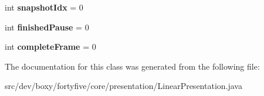 \begin{DoxyCompactItemize}
\item 
\hypertarget{classdev_1_1boxy_1_1fortyfive_1_1core_1_1presentation_1_1_linear_presentation_a1da66d84774b87c1dd6d9b6250d5b164}{
int {\bfseries snapshotIdx} = 0}
\label{db/dad/classdev_1_1boxy_1_1fortyfive_1_1core_1_1presentation_1_1_linear_presentation_a1da66d84774b87c1dd6d9b6250d5b164}

\item 
\hypertarget{classdev_1_1boxy_1_1fortyfive_1_1core_1_1presentation_1_1_linear_presentation_af3be3d966de2ecedda3db8c86c3a548d}{
int {\bfseries finishedPause} = 0}
\label{db/dad/classdev_1_1boxy_1_1fortyfive_1_1core_1_1presentation_1_1_linear_presentation_af3be3d966de2ecedda3db8c86c3a548d}

\item 
\hypertarget{classdev_1_1boxy_1_1fortyfive_1_1core_1_1presentation_1_1_linear_presentation_a40a3d6791c7eb8a7fdcf69e92d1410b0}{
int {\bfseries completeFrame} = 0}
\label{db/dad/classdev_1_1boxy_1_1fortyfive_1_1core_1_1presentation_1_1_linear_presentation_a40a3d6791c7eb8a7fdcf69e92d1410b0}

\end{DoxyCompactItemize}


The documentation for this class was generated from the following file:\begin{DoxyCompactItemize}
\item 
src/dev/boxy/fortyfive/core/presentation/LinearPresentation.java\end{DoxyCompactItemize}

